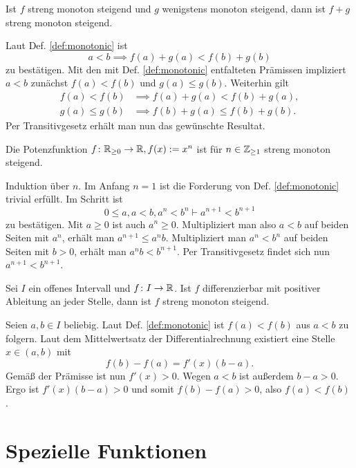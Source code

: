 \begin{Satz}
Ist $f$ streng monoton steigend und $g$ wenigstens monoton steigend,
dann ist $f+g$ streng monoton steigend.
\end{Satz}
\begin{Beweis}
Laut Def. \ref{def:monotonic} ist
\[a<b\implies f(a)+g(a) < f(b)+g(b)\]
zu bestätigen. Mit den mit Def. \ref{def:monotonic} entfalteten Prämissen
impliziert $a<b$ zunächst $f(a)<f(b)$ und $g(a)\le g(b)$. Weiterhin gilt
\begin{align*}
f(a) < f(b) &\implies f(a)+g(a) < f(b)+g(a),\\
g(a)\le g(b) &\implies f(b)+g(a)\le f(b)+g(b).
\end{align*}
Per Transitivgesetz erhält man nun das gewünschte Resultat.\,\qedsymbol
\end{Beweis}

\begin{Satz}
Die Potenzfunktion $f\colon\mathbb R_{\ge 0}\to\mathbb R, f(x):=x^n$ ist für $n\in\mathbb Z_{\ge 1}$
streng monoton steigend.
\end{Satz}
\begin{Beweis}
Induktion über $n$. Im Anfang $n=1$ ist die Forderung von Def.
\ref{def:monotonic} trivial erfüllt. Im Schritt ist
\[0\le a,a<b,a^n<b^n\vdash a^{n+1}<b^{n+1}\]
zu bestätigen. Mit $a\ge 0$ ist auch $a^n\ge 0$.
Multipliziert man also $a<b$ auf beiden Seiten mit $a^n$,
erhält man $a^{n+1}\le a^n b$. Multipliziert man $a^n<b^n$ auf beiden
Seiten mit $b>0$, erhält man $a^n b < b^{n+1}$. Per Transitivgesetz
findet sich nun $a^{n+1}<b^{n+1}$.\,\qedsymbol
\end{Beweis}

\begin{Satz}
Sei $I$ ein offenes Intervall und $f\colon I\to\mathbb R$. Ist $f$ differenzierbar
mit positiver Ableitung an jeder Stelle, dann ist $f$ streng monoton steigend.
\end{Satz}
\begin{Beweis}
Seien $a,b\in I$ beliebig. Laut Def. \ref{def:monotonic} ist $f(a)<f(b)$
aus $a<b$ zu folgern. Laut dem Mittelwertsatz der Differentialrechnung
existiert eine Stelle $x\in (a,b)$ mit
\[f(b)-f(a) = f'(x)(b-a).\]
Gemäß der Prämisse ist nun $f'(x)>0$. Wegen $a<b$ ist außerdem $b-a>0$.
Ergo ist $f'(x)(b-a)>0$ und somit $f(b)-f(a)>0$, also $f(a)<f(b)$.\,\qedsymbol
\end{Beweis}

\newpage
\section{Spezielle Funktionen}

